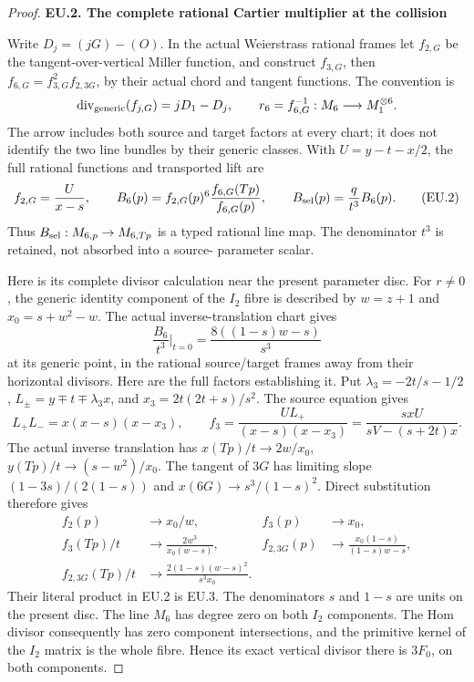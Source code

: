 \begin{proof}
\par

\medskip\noindent\textbf{EU.2. The complete rational Cartier multiplier at the collision}

\par\nobreak

Write \(D_j=(jG)-(O)\). In the actual Weierstrass rational frames let
\(f_{2,G}\) be the tangent-over-vertical Miller function, and construct
\(f_{3,G}\), then \(f_{6,G}=f_{3,G}^2f_{2,3G}\), by their actual chord
and tangent functions. The convention is
\[
 \operatorname{div}_{\rm generic}(f_{j,G})=jD_1-D_j,
 \qquad r_6=f_{6,G}^{-1}:M_6\longrightarrow M_1^{\otimes6}.
\]
The arrow includes both source and target factors at every chart; it
does not identify the two line bundles by their generic classes. With
\(U=y-t-x/2\), the full rational functions and transported lift are
\[
 f_{2,G}=\frac{U}{x-s},\qquad
 B_6(p)=f_{2,G}(p)^6\frac{f_{6,G}(Tp)}{f_{6,G}(p)},\qquad
 B_{\rm sel}(p)=\frac{q}{t^3}B_6(p).
 \tag{EU.2}
\]
Thus \(B_{\rm sel}:M_{6,p}\to M_{6,Tp}\) is a typed rational line map.
The denominator \(t^3\) is retained, not absorbed into a source-
parameter scalar.

Here is its complete divisor calculation near the present parameter
disc. For \(r\ne0\), the generic identity component of the \(I_2\)
fibre is described by \(w=z+1\) and
\(x_0=s+w^2-w\). The actual inverse-translation chart gives
\[
 \frac{B_6}{t^3}\bigg|_{t=0}
       =\frac{8((1-s)w-s)}{s^3}
 \tag{EU.3}
\]
at its generic point, in the rational source/target frames away from
their horizontal divisors. Here are the full factors establishing it.
Put \(\lambda_3=-2t/s-1/2\),
\(L_\pm=y\mp t\mp\lambda_3x\), and
\(x_3=2t(2t+s)/s^2\). The source equation gives
\[
 L_+L_-=x(x-s)(x-x_3),\qquad
 f_3=\frac{UL_+}{(x-s)(x-x_3)}
     =\frac{s xU}{sV-(s+2t)x}.
\]
The actual inverse translation has
\(x(Tp)/t\to2w/x_0\), \(y(Tp)/t\to(s-w^2)/x_0\).
The tangent of \(3G\) has limiting slope
\((1-3s)/(2(1-s))\) and \(x(6G)\to s^3/(1-s)^2\).
Direct substitution therefore gives
\[
\begin{aligned}
 f_2(p)&\to x_0/w,& f_3(p)&\to x_0,\\
 f_3(Tp)/t&\to\frac{2w^3}{x_0(w-s)},&
 f_{2,3G}(p)&\to\frac{x_0(1-s)}{(1-s)w-s},\\
 f_{2,3G}(Tp)/t&\to
       \frac{2(1-s)(w-s)^2}{s^3x_0}.
\end{aligned}
\]
Their literal product in EU.2 is EU.3. The denominators
\(s\) and \(1-s\) are units on the present disc. The line \(M_6\)
has degree zero on both \(I_2\) components. The Hom divisor consequently
has zero component intersections, and the primitive kernel of the
\(I_2\) matrix is the whole fibre. Hence its exact vertical divisor
there is \(3F_0\), on both components.


\end{proof}
